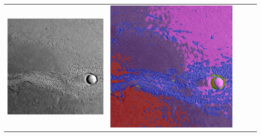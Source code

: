 \begin{table}[h!]
\begin{tabularx}{\textwidth}{>{\centering}m{}
			>{\centering}m{}
			>{\centering}m{}
			>{\centering}m{}
			>{\centering\arraybackslash}m{}}
		\includegraphics[width=0.9\linewidth]{images/p03/p03_02.png} &
		\includegraphics[width=0.9\linewidth]{images/gen/fully_connected/p03_02.png_0.png} &

\end{tabularx}
\end{table}
